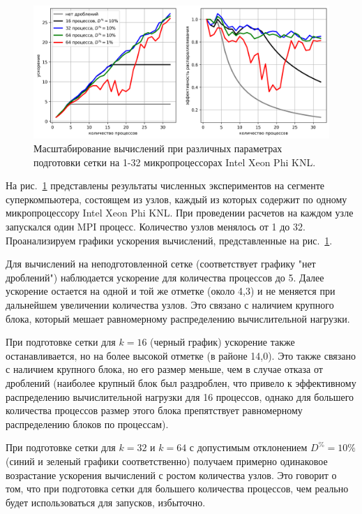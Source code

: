 \begin{figure}[ht]
\centering
\includegraphics[width=1.0\textwidth]{fig/par_scaling3.png}
\singlespacing
{}\caption{Масштабирование вычислений при различных параметрах подготовки сетки на 1-32 микропроцессорах Intel Xeon Phi KNL.}
\label{fig:text_2_withcut_scaling3}
\end{figure}

На рис.~\ref{fig:text_2_withcut_scaling3} представлены результаты численных экспериментов на сегменте суперкомпьютера, состоящем из узлов, каждый из которых содержит по одному микропроцессору Intel Xeon Phi KNL.
При проведении расчетов на каждом узле запускался один MPI процесс.
Количество узлов менялось от 1 до 32.
Проанализируем графики ускорения вычислений, представленные на рис.~\ref{fig:text_2_withcut_scaling3}.

Для вычислений на неподготовленной сетке (соответствует графику "нет дроблений") наблюдается ускорение для количества процессов до 5.
Далее ускорение остается на одной и той же отметке (около 4,3) и не меняется при дальнейшем увеличении количества узлов.
Это связано с наличием крупного блока, который мешает равномерному распределению вычислительной нагрузки.

При подготовке сетки для $k = 16$ (черный график) ускорение также останавливается, но на более высокой отметке (в районе 14,0).
Это также связано с наличием крупного блока, но его размер меньше, чем в случае отказа от дроблений (наиболее крупный блок был раздроблен, что привело к эффективному распределению вычислительной нагрузки для 16 процессов, однако для большего количества процессов размер этого блока препятствует равномерному распределению блоков по процессам).

При подготовке сетки для $k = 32$ и $k = 64$ с допустимым отклонением $D^{\%} = 10\%$ (синий и зеленый графики соответственно) получаем примерно одинаковое возрастание ускорения вычислений с ростом количества узлов.
Это говорит о том, что при подготовка сетки для большего количества процессов, чем реально будет использоваться для запусков, избыточно.

